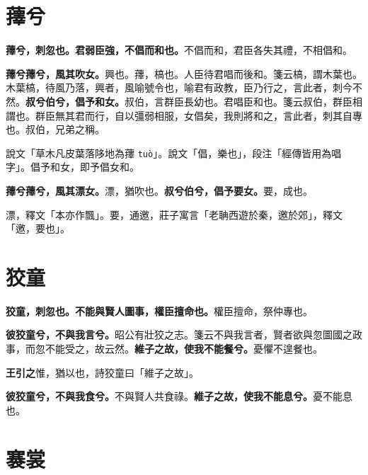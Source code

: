 \section{蘀兮}


\textbf{蘀兮，刺忽也。君弱臣強，不倡而和也。}{\footnotesize 不倡而和，君臣各失其禮，不相倡和。}

\textbf{蘀兮蘀兮，風其吹女。}{\footnotesize 興也。蘀，槁也。人臣待君唱而後和。箋云槁，謂木葉也。木葉槁，待風乃落，興者，風喻號令也，喻君有政教，臣乃行之，言此者，刺今不然。}\textbf{叔兮伯兮，倡予和女。}{\footnotesize 叔伯，言群臣長幼也。君唱臣和也。箋云叔伯，群臣相謂也。群臣無其君而行，自以彊弱相服，女倡矣，我則將和之，言此者，刺其自專也。叔伯，兄弟之稱。}

\begin{quoting}說文「草木凡皮葉落陊地為蘀 \texttt{tuò}」。說文「倡，樂也」，段注「經傳皆用為唱字」。倡予和女，即予倡女和。\end{quoting}

\textbf{蘀兮蘀兮，風其漂女。}{\footnotesize 漂，猶吹也。}\textbf{叔兮伯兮，倡予要女。}{\footnotesize 要，成也。}

\begin{quoting}漂，釋文「本亦作飄」。要，通邀，莊子寓言「老聃西遊於秦，邀於郊」，釋文「邀，要也」。\end{quoting}

\section{狡童}


\textbf{狡童，刺忽也。不能與賢人圖事，權臣擅命也。}{\footnotesize 權臣擅命，祭仲專也。}

\textbf{彼狡童兮，不與我言兮。}{\footnotesize 昭公有壯狡之志。箋云不與我言者，賢者欲與忽圖國之政事，而忽不能受之，故云然。}\textbf{維子之故，使我不能餐兮。}{\footnotesize 憂懼不遑餐也。}

\begin{quoting}\textbf{王引之}惟，猶以也，詩狡童曰「維子之故」。\end{quoting}

\textbf{彼狡童兮，不與我食兮。}{\footnotesize 不與賢人共食祿。}\textbf{維子之故，使我不能息兮。}{\footnotesize 憂不能息也。}

\section{褰裳}

